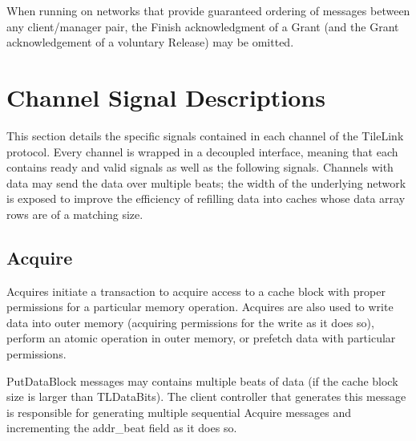 When running on networks that provide guaranteed ordering of messages between any client/manager pair, the Finish acknowledgment of a Grant (and the Grant acknowledgement of a voluntary Release) may be omitted.

\section{Channel Signal Descriptions}

This section details the specific signals contained in each channel of the TileLink protocol.
Every channel is wrapped in a decoupled interface, meaning that each contains ready and valid signals as well as the following signals.
Channels with data may send the data over multiple beats; the width of the underlying network is exposed to improve the efficiency of refilling data into caches whose data array rows are of a matching size.

\subsection{Acquire}

Acquires initiate a transaction to acquire access to a cache block with proper permissions for a particular memory operation.
Acquires are also used to write data into outer memory (acquiring permissions for the write as it does so), perform an atomic operation in outer memory, or prefetch data with particular permissions.

PutDataBlock messages may contains multiple beats of data (if the cache block size is larger than TLDataBits).
The client controller that generates this message is responsible for generating multiple sequential Acquire messages and incrementing the addr\_beat field as it does so.

